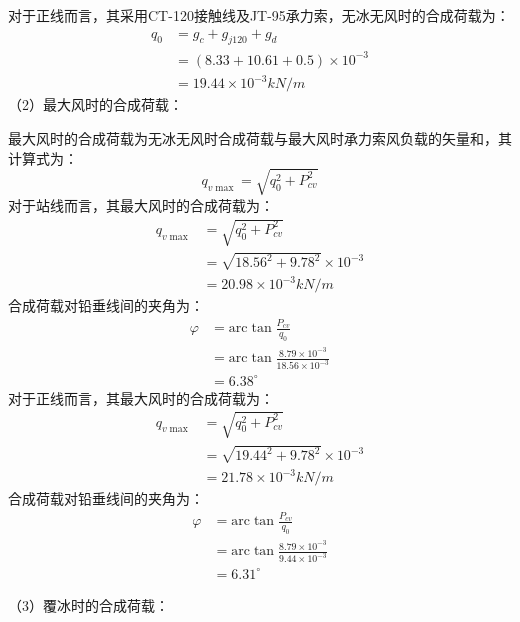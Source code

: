 对于正线而言，其采用CT-120接触线及JT-95承力索，无冰无风时的合成荷载为：
\begin{align*}
	q_0&=g_c+g_{j120}+g_d
	\\
	&=\left( 8.33+10.61+0.5 \right) \times 10^{-3}
	\\
	&=19.44\times 10^{-3}kN/m
\end{align*}
（2）最大风时的合成荷载：

最大风时的合成荷载为无冰无风时合成荷载与最大风时承力索风负载的矢量和，其计算式为：
$$
q_{v\max}=\sqrt{q_{0}^{2}+P_{cv}^{2}}
$$
对于站线而言，其最大风时的合成荷载为：
\begin{align*}
	q_{v\max}&=\sqrt{q_{0}^{2}+P_{cv}^{2}}
	\\
	&=\sqrt{18.56^2+9.78^2}\times 10^{-3}
	\\
	&=20.98\times 10^{-3}kN/m
\end{align*}
合成荷载对铅垂线间的夹角为：
\begin{align*}
	\varphi &=\mathrm{arc}\tan \frac{P_{cv}}{q_0}
	\\
	&=\mathrm{arc}\tan \frac{8.79\times 10^{-3}}{18.56\times 10^{-3}}
	\\
	&=6.38^{\circ}
\end{align*}
对于正线而言，其最大风时的合成荷载为：
\begin{align*}
	q_{v\max}&=\sqrt{q_{0}^{2}+P_{cv}^{2}}
	\\
	&=\sqrt{19.44^2+9.78^2}\times 10^{-3}
	\\
	&=21.78\times 10^{-3}kN/m
\end{align*}
合成荷载对铅垂线间的夹角为：
\begin{align*}
	\varphi &=\mathrm{arc}\tan \frac{P_{cv}}{q_0}
	\\
	&=\mathrm{arc}\tan \frac{8.79\times 10^{-3}}{9.44\times 10^{-3}}
	\\
	&=6.31^{\circ}
\end{align*}

（3）覆冰时的合成荷载：

